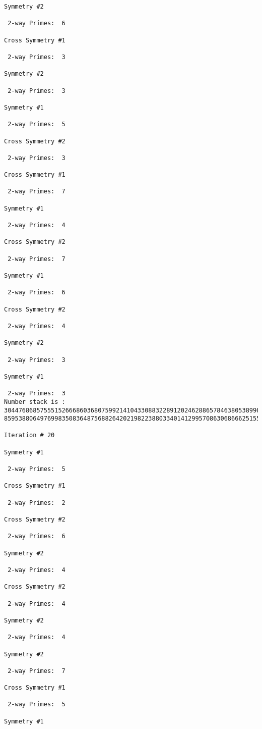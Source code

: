 {{{{\begin{verbatim}
Symmetry #2

 2-way Primes: 	6

Cross Symmetry #1

 2-way Primes: 	3

Symmetry #2

 2-way Primes: 	3

Symmetry #1

 2-way Primes: 	5

Cross Symmetry #2

 2-way Primes: 	3

Cross Symmetry #1

 2-way Primes: 	7

Symmetry #1

 2-way Primes: 	4

Cross Symmetry #2

 2-way Primes: 	7

Symmetry #1

 2-way Primes: 	6

Cross Symmetry #2

 2-way Primes: 	4

Symmetry #2

 2-way Primes: 	3

Symmetry #1

 2-way Primes: 	3
Number stack is :
30447686857555152666860368075992141043308832289120246288657846380538996794608835958544046240163340857
85953880649769983508364875688264202198223880334014129957086306866625155575868674403758043361042640445

Iteration #	20

Symmetry #1

 2-way Primes: 	5

Cross Symmetry #1

 2-way Primes: 	2

Cross Symmetry #2

 2-way Primes: 	6

Symmetry #2

 2-way Primes: 	4

Cross Symmetry #2

 2-way Primes: 	4

Symmetry #2

 2-way Primes: 	4

Symmetry #2

 2-way Primes: 	7

Cross Symmetry #1

 2-way Primes: 	5

Symmetry #1


\end{verbatim}}}}}
